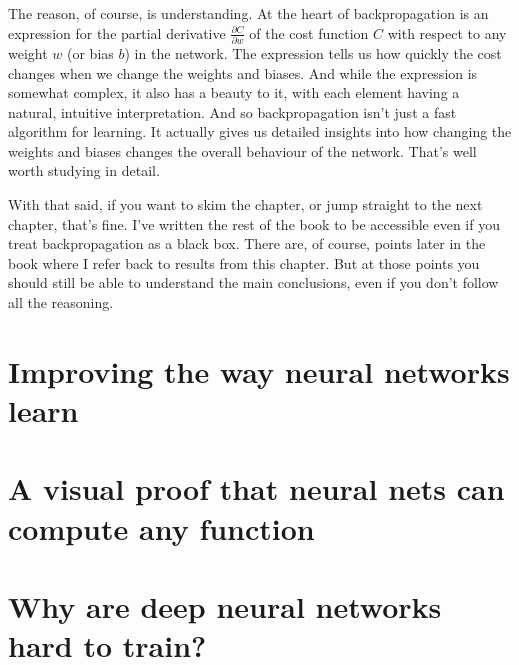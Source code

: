 \documentclass[a4paper,12pt]{report}%
\begin{document}
\smallskip

The reason, of course, is understanding. At the heart of backpropagation is an expression for the partial derivative $\frac{\partial C}{\partial w}$ of the cost function $C$ with respect to any weight $w$ (or bias $b$) in the network. The expression tells us how quickly the cost changes when we change the weights and biases. And while the expression is somewhat complex, it also has a beauty to it, with each element having a natural, intuitive interpretation. And so backpropagation isn't just a fast algorithm for learning. It actually gives us detailed insights into how changing the weights and biases changes the overall behaviour of the network. That's well worth studying in detail.

\smallskip

With that said, if you want to skim the chapter, or jump straight to the next chapter, that's fine. I've written the rest of the book to be accessible even if you treat backpropagation as a black box. There are, of course, points later in the book where I refer back to results from this chapter. But at those points you should still be able to understand the main conclusions, even if you don't follow all the reasoning.




%



\chapter{\color{IAF} \bf Improving the way neural networks learn}




\chapter{\color{IAF} \bf A visual proof that neural nets can compute any function}



\chapter{\color{IAF} \bf Why are deep neural networks hard to train?}
\end{document}
